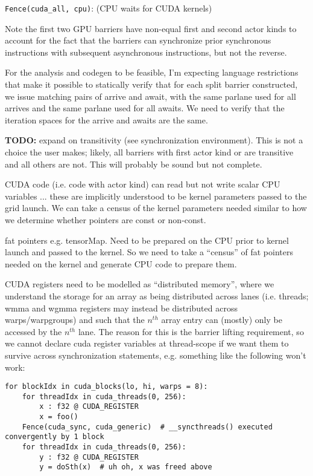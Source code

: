 \texttt{Fence(cuda\_all, cpu)}:  (CPU waits for CUDA kernels)

\filbreak
Note the first two GPU barriers have non-equal first and second actor kinds to account for the fact that the barriers can synchronize prior synchronous instructions with subsequent asynchronous instructions, but not the reverse.

\filbreak
{} For the analysis and codegen to be feasible, I'm expecting language restrictions that make it possible to statically verify that for each split barrier constructed, we issue matching pairs of arrive and await, with the same parlane used for all arrives and the same parlane used for all awaits.
We need to verify that the iteration spaces for the arrive and awaits are the same.

\filbreak
\textbf{TODO:} expand on transitivity (see synchronization environment).
This is not a choice the user makes; likely, all barriers with first actor kind  or  are transitive and all others are not.
This will probably be sound but not complete.

\filbreak
{} CUDA code (i.e. code with  actor kind) can read but not write scalar CPU variables ... these are implicitly understood to be kernel parameters passed to the grid launch.
We can take a census of the kernel parameters needed similar to how we determine whether pointers are const or non-const.

 fat pointers e.g. tensorMap.
Need to be prepared on the CPU prior to kernel launch and passed to the kernel.
So we need to take a ``census'' of fat pointers needed on the kernel and generate CPU code to prepare them.

\filbreak
{} CUDA registers need to be modelled as ``distributed memory'', where we understand the storage for an array as being distributed across lanes (i.e. threads; wmma and wgmma registers may instead be distributed across warps/warpgroups) and such that the $n^{th}$ array entry can (mostly) only be accessed by the $n^{th}$ lane.
The reason for this is the barrier lifting requirement, so we cannot declare cuda register variables at thread-scope if we want them to survive across synchronization statements, e.g. something like the following won't work:

\filbreak
{\color{lightttColor}
\begin{verbatim}
for blockIdx in cuda_blocks(lo, hi, warps = 8):
    for threadIdx in cuda_threads(0, 256):
        x : f32 @ CUDA_REGISTER
        x = foo()
    Fence(cuda_sync, cuda_generic)  # __syncthreads() executed convergently by 1 block
    for threadIdx in cuda_threads(0, 256):
        y : f32 @ CUDA_REGISTER
        y = doSth(x)  # uh oh, x was freed above
\end{verbatim}
}

